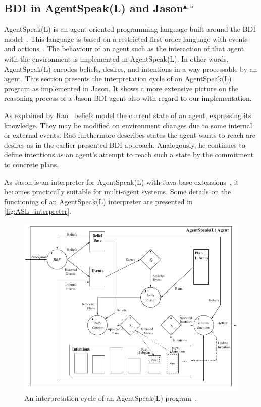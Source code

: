 \subsection[BDI in AgentSpeak(L) and Jason]{BDI in AgentSpeak(L) and Jason$^{\blacktriangle,\circ}$}
AgentSpeak(L) is an agent-oriented programming language built around the BDI model~\cite{rafael_BDIAgent_2005}.
This language is based on a restricted first-order language with events and actions~\cite{anand_AgentSpeak_1996}.
The behaviour of an agent such as the interaction of that agent with the environment is implemented in AgentSpeak(L).
In other words, AgentSpeak(L) encodes beliefs, desires, and intentions in a way processable by an agent.
This section presents the interpretation cycle of an AgentSpeak(L) program as implemented in Jason.
It shows a more extensive picture on the reasoning process of a Jason BDI agent also with regard to our implementation.

As explained by Rao~\cite{anand_AgentSpeak_1996} beliefs model the current state of an agent, expressing its knowledge.
They may be modified on environment changes due to some internal or external events.
Rao furthermore describes states the agent wants to reach are desires as in the earlier presented BDI approach.
Analogously, he continues to define intentions as an agent's attempt to reach such a state by the commitment to concrete plans.

As Jason is an interpreter for AgentSpeak(L) with Java-base extensions~\cite{rafael_Javabased}, it becomes practically suitable for multi-agent systems.
Some details on the functioning of an AgentSpeak(L) interpreter are presented in \autoref{fig:ASL_interpreter}.
\begin{figure}[h]
  \centering
  \includegraphics[width=\textwidth]{images/BDI_ASL_interpreter}
  \caption{An interpretation cycle of an AgentSpeak(L) program~\cite{rafael_BDIAgent_2005}.}
  \label{fig:ASL_interpreter}
\end{figure}

